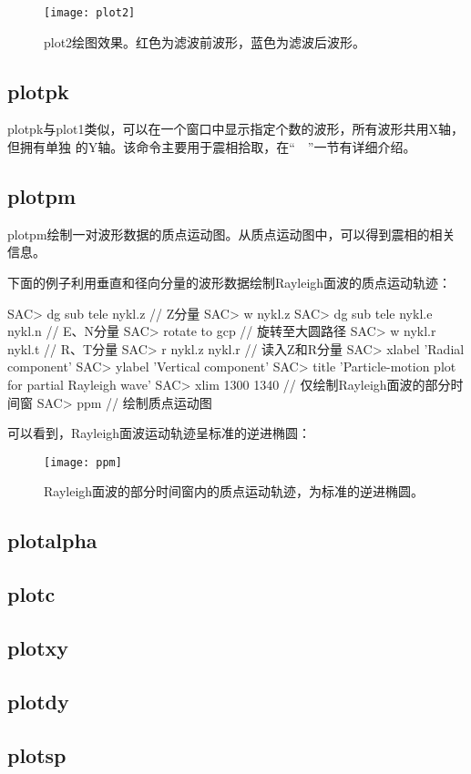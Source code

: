 \begin{figure}[H]
\centering
\texttt{[image: plot2]}
\caption[plot2绘图效果]{plot2绘图效果。红色为滤波前波形，蓝色为滤波后波形。}
\label{fig:plot2}
\end{figure}

\subsection{plotpk}
plotpk与plot1类似，可以在一个窗口中显示指定个数的波形，所有波形共用X轴，但拥有单独
的Y轴。该命令主要用于震相拾取，在``~~''一节有详细介绍。

\subsection{plotpm}
plotpm绘制一对波形数据的质点运动图。从质点运动图中，可以得到震相的相关信息。

下面的例子利用垂直和径向分量的波形数据绘制Rayleigh面波的质点运动轨迹：
\begin{SACCode}
SAC> dg sub tele nykl.z             // Z分量        
SAC> w nykl.z           
SAC> dg sub tele nykl.e nykl.n      // E、N分量
SAC> rotate to gcp                  // 旋转至大圆路径
SAC> w nykl.r nykl.t                // R、T分量
SAC> r nykl.z nykl.r                // 读入Z和R分量
SAC> xlabel 'Radial component'
SAC> ylabel 'Vertical component'
SAC> title 'Particle-motion plot for partial Rayleigh wave'
SAC> xlim 1300 1340                 // 仅绘制Rayleigh面波的部分时间窗
SAC> ppm                            // 绘制质点运动图
\end{SACCode}

可以看到，Rayleigh面波运动轨迹呈标准的逆进椭圆：
\begin{figure}[H]
\centering
\texttt{[image: ppm]}
\caption[质点运动图。]{Rayleigh面波的部分时间窗内的质点运动轨迹，为标准的逆进椭圆。}
\label{fig:ppm}
\end{figure}

\subsection{plotalpha}
\subsection{plotc}
\subsection{plotxy}
\subsection{plotdy}
\subsection{plotsp}
